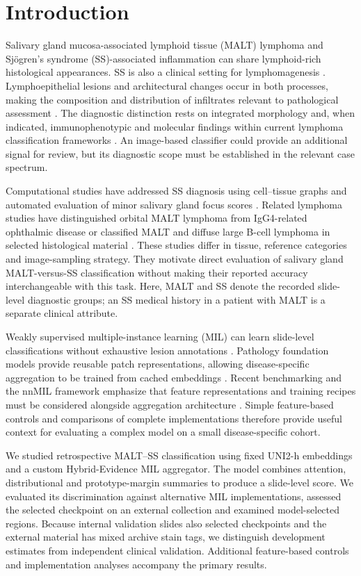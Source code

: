 \section{Introduction}
Salivary gland mucosa-associated lymphoid tissue (MALT) lymphoma and Sjögren's syndrome (SS)-associated inflammation can share lymphoid-rich histological appearances. SS is also a clinical setting for lymphomagenesis \citep{ref1}. Lymphoepithelial lesions and architectural changes occur in both processes, making the composition and distribution of infiltrates relevant to pathological assessment \citep{ref2}. The diagnostic distinction rests on integrated morphology and, when indicated, immunophenotypic and molecular findings within current lymphoma classification frameworks \citep{ref3,ref4}. An image-based classifier could provide an additional signal for review, but its diagnostic scope must be established in the relevant case spectrum.

Computational studies have addressed SS diagnosis using cell--tissue graphs and automated evaluation of minor salivary gland focus scores \citep{ref10,ref23}. Related lymphoma studies have distinguished orbital MALT lymphoma from IgG4-related ophthalmic disease or classified MALT and diffuse large B-cell lymphoma in selected histological material \citep{ref11,ref24}. These studies differ in tissue, reference categories and image-sampling strategy. They motivate direct evaluation of salivary gland MALT-versus-SS classification without making their reported accuracy interchangeable with this task. Here, MALT and SS denote the recorded slide-level diagnostic groups; an SS medical history in a patient with MALT is a separate clinical attribute.

Weakly supervised multiple-instance learning (MIL) can learn slide-level classifications without exhaustive lesion annotations \citep{ref5,ref6,ref7}. Pathology foundation models provide reusable patch representations, allowing disease-specific aggregation to be trained from cached embeddings \citep{ref8,ref9}. Recent benchmarking and the nnMIL framework emphasize that feature representations and training recipes must be considered alongside aggregation architecture \citep{ref25,ref26}. Simple feature-based controls and comparisons of complete implementations therefore provide useful context for evaluating a complex model on a small disease-specific cohort.

We studied retrospective MALT--SS classification using fixed UNI2-h embeddings and a custom Hybrid-Evidence MIL aggregator. The model combines attention, distributional and prototype-margin summaries to produce a slide-level score. We evaluated its discrimination against alternative MIL implementations, assessed the selected checkpoint on an external collection and examined model-selected regions. Because internal validation slides also selected checkpoints and the external material has mixed archive stain tags, we distinguish development estimates from independent clinical validation. Additional feature-based controls and implementation analyses accompany the primary results.
